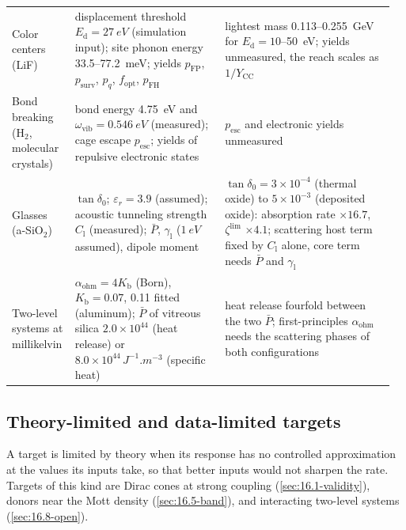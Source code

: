 \begin{table}[tbp]
\begin{tabular}{@{}>{\raggedright\arraybackslash}p{0.15\linewidth}>{\raggedright\arraybackslash}p{0.38\linewidth}>{\raggedright\arraybackslash}p{0.43\linewidth}@{}}
    Color centers (LiF) & displacement threshold $E_{\mathrm{d}} = \SI{27}{eV}$ (simulation input); site phonon energy 33.5--\SI{77.2}{meV}; yields $p_{\mathrm{FP}}$, $p_{\mathrm{surv}}$, $p_q$, $f_{\mathrm{opt}}$, $p_{\mathrm{FH}}$ & lightest mass 0.113--\SI{0.255}{GeV} for $E_{\mathrm{d}} = 10$--\SI{50}{eV}; yields unmeasured, the reach scales as $1/Y_{\mathrm{CC}}$ \\
    Bond breaking (H$_2$, molecular crystals) & bond energy \SI{4.75}{eV} and $\omega_{\mathrm{vib}} = \SI{0.546}{eV}$ (measured); cage escape $p_{\mathrm{esc}}$; yields of repulsive electronic states & $p_{\mathrm{esc}}$ and electronic yields unmeasured \\
    Glasses (a-SiO$_2$) & $\tan\delta_0$; $\varepsilon_r = 3.9$ (assumed); acoustic tunneling strength $C_{\mathrm{l}}$ (measured); $\bar P$, $\gamma_{\mathrm{l}}$ ($\SI{1}{eV}$ assumed), dipole moment & $\tan\delta_0 = 3\times10^{-4}$ (thermal oxide) to $5\times10^{-3}$ (deposited oxide): absorption rate $\times16.7$, $\zeta^{\mathrm{lim}}$ $\times4.1$; scattering host term fixed by $C_{\mathrm{l}}$ alone, core term needs $\bar P$ and $\gamma_{\mathrm{l}}$ \\
    Two-level systems at millikelvin & $\alpha_{\mathrm{ohm}} = 4K_{\mathrm{b}}$ (Born), $K_{\mathrm{b}} = 0.07$, 0.11 fitted (aluminum); $\bar P$ of vitreous silica $2.0\times10^{44}$ (heat release) or $8.0\times10^{44}\,\si{J^{-1}.m^{-3}}$ (specific heat) & heat release fourfold between the two $\bar P$; first-principles $\alpha_{\mathrm{ohm}}$ needs the scattering phases of both configurations \\
    \bottomrule
  \end{tabular}
\end{table}

\subsection{Theory-limited and data-limited targets}\label{sec:16.9-limits}

A target is limited by theory when its response has no controlled approximation at the values its inputs take, so that better inputs would not sharpen the rate. Targets of this kind are Dirac cones at strong coupling (\cref{sec:16.1-validity}), donors near the Mott density (\cref{sec:16.5-band}), and interacting two-level systems (\cref{sec:16.8-open}).

